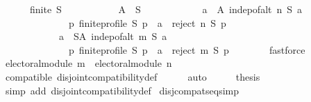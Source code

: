 \begin{isabellebody}
\ \ \ \ \ \ {\isachardoublequoteopen}finite\ S\ {\isasymlongrightarrow}\isanewline
\ \ \ \ \ \ \ \ \ \ {\isacharparenleft}{\kern0pt}{\isasymexists}A\ {\isasymsubseteq}\ S{\isachardot}{\kern0pt}\isanewline
\ \ \ \ \ \ \ \ \ \ \ \ {\isacharparenleft}{\kern0pt}{\isasymforall}a\ {\isasymin}\ A{\isachardot}{\kern0pt}\ indep{\isacharunderscore}{\kern0pt}of{\isacharunderscore}{\kern0pt}alt\ n\ S\ a\ {\isasymand}\isanewline
\ \ \ \ \ \ \ \ \ \ \ \ \ \ {\isacharparenleft}{\kern0pt}{\isasymforall}p{\isachardot}{\kern0pt}\ finite{\isacharunderscore}{\kern0pt}profile\ S\ p\ {\isasymlongrightarrow}\ a\ {\isasymin}\ reject\ n\ S\ p{\isacharparenright}{\kern0pt}{\isacharparenright}{\kern0pt}\ {\isasymand}\isanewline
\ \ \ \ \ \ \ \ \ \ \ \ {\isacharparenleft}{\kern0pt}{\isasymforall}a\ {\isasymin}\ S{\isacharminus}{\kern0pt}A{\isachardot}{\kern0pt}\ indep{\isacharunderscore}{\kern0pt}of{\isacharunderscore}{\kern0pt}alt\ m\ S\ a\ {\isasymand}\isanewline
\ \ \ \ \ \ \ \ \ \ \ \ \ \ {\isacharparenleft}{\kern0pt}{\isasymforall}p{\isachardot}{\kern0pt}\ finite{\isacharunderscore}{\kern0pt}profile\ S\ p\ {\isasymlongrightarrow}\ a\ {\isasymin}\ reject\ m\ S\ p{\isacharparenright}{\kern0pt}{\isacharparenright}{\kern0pt}{\isacharparenright}{\kern0pt}{\isachardoublequoteclose}\isanewline
\ \ \ \ \ \ \isamarkupfalse%
\ fastforce\isanewline
\ \ \isamarkupfalse%
\isanewline
\ \ \isamarkupfalse%
\ \isamarkupfalse%
\ {\isachardoublequoteopen}electoral{\isacharunderscore}{\kern0pt}module\ m\ {\isasymand}\ electoral{\isacharunderscore}{\kern0pt}module\ n{\isachardoublequoteclose}\isanewline
\ \ \ \ \isamarkupfalse%
\ compatible\ disjoint{\isacharunderscore}{\kern0pt}compatibility{\isacharunderscore}{\kern0pt}def\isanewline
\ \ \ \ \isamarkupfalse%
\ auto\isanewline
\ \ \isamarkupfalse%
\ \isamarkupfalse%
\ {\isacharquery}{\kern0pt}thesis\isanewline
\ \ \ \ \isamarkupfalse%
\ {\isacharparenleft}{\kern0pt}simp\ add{\isacharcolon}{\kern0pt}\ disjoint{\isacharunderscore}{\kern0pt}compatibility{\isacharunderscore}{\kern0pt}def{\isacharparenright}{\kern0pt}\isanewline
{}\isamarkupfalse%
%
\endisatagproof
{\isafoldproof}%
%
\isadelimproof
\isanewline
%
\endisadelimproof
\isanewline
\isanewline
{}\isamarkupfalse%
\ disj{\isacharunderscore}{\kern0pt}compat{\isacharunderscore}{\kern0pt}seq{\isacharbrackleft}{\kern0pt}simp{\isacharbrackright}{\kern0pt}{\isacharcolon}{\kern0pt}\isanewline
\ \ \isanewline

\end{isabellebody}
